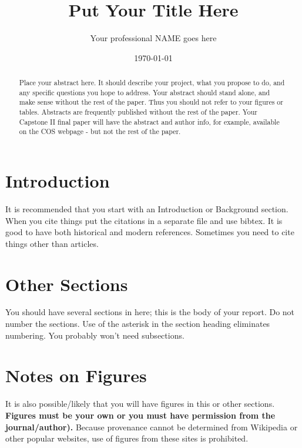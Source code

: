 \documentclass[aps,prb,twocolumn,groupedaddress,nofootinbib,floatfix]{revtex4}
\begin{document}
%
\title{Put Your Title Here}

%
\author{Your professional NAME goes here}
%
%
%
%

\date{\today}

\begin{abstract} \noindent Place your abstract here.  It should describe your project, what you propose to do, and any specific questions you hope to address.   Your abstract should stand alone, and make sense without the rest of the paper.   Thus you should not refer to your figures or tables.   Abstracts are frequently published without the rest of the paper.   Your Capstone II final paper will have the abstract and author info, for example, available on the COS webpage - but not the rest of the paper.
\end{abstract}

\maketitle

\section*{Introduction}
It is recommended that you start with an Introduction or Background
section.  When you cite things \cite{Foner1} put the citations in a separate file and
use bibtex.   It is good to have both historical and modern references. \cite{Tickle,Basso}
Sometimes you need to cite things other than articles. \cite{UnitsTable}
%
\section*{Other Sections}
You should have several sections in here; this is the body of your report.   Do not number the sections.
Use of the asterisk in the section heading eliminates numbering.   You probably won't need subsections.
%
\section*{Notes on Figures}
It is also possible/likely that you will have figures in this or other
sections.  \textbf{Figures must be your own or you
must have permission from the journal/author).}  Because provenance
cannot be determined from Wikipedia or other popular websites, use of
figures from these sites is prohibited.   
\end{document}

